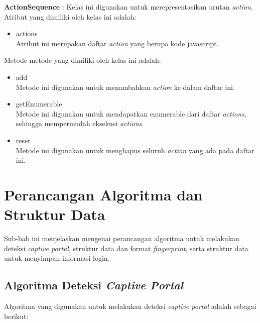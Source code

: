 \par{\textbf{ActionSequence} : Kelas ini digunakan untuk merepresentasikan urutan \textit{action}. Atribut yang dimiliki oleh kelas ini adalah:
    \begin{itemize}
        \item{actions\\Atribut ini merupakan daftar \textit{action} yang berupa kode javascript.}
    \end{itemize}
    Metode-metode yang dimiliki oleh kelas ini adalah:
    \begin{itemize}
        \item{add\\Metode ini digunakan untuk menambahkan \textit{action} ke dalam daftar ini.}
        \item{getEnumerable\\Metode ini digunakan untuk mendapatkan enumerable dari daftar \textit{actions}, sehingga mempermudah eksekusi \textit{actions}.}
        \item{reset\\Metode ini digunakan untuk menghapus seluruh \textit{action} yang ada pada daftar ini.}
    \end{itemize}
}



\section{Perancangan Algoritma dan Struktur Data}
\label{sec:perancangan_algoritma_dan_struktur_data}

Sub-bab ini menjelaskan mengenai perancangan algoritma untuk melakukan deteksi \textit{captive portal}, struktur data dan format \textit{fingerprint}, serta struktur data untuk menyimpan informasi login.

\subsection{Algoritma Deteksi \textit{Captive Portal}}
\label{subsec:algoritma_deteksi_captive_portal}

Algoritma yang digunakan untuk melakukan deteksi \textit{captive portal} adalah sebagai berikut:

\hfill

\begin{algorithm}[H]
\end{algorithm}

